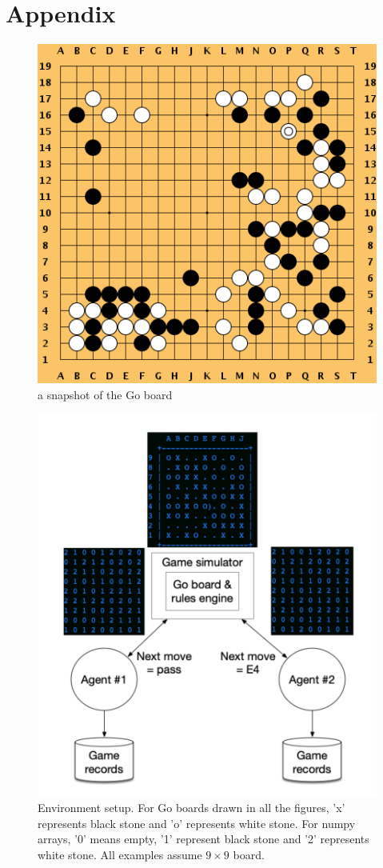 \documentclass{article}
\begin{document}
 

\section*{Appendix}
\begin{figure}[H]
\begin{center}
\includegraphics[width=0.25\linewidth]{goboard}
\end{center}
\caption{a snapshot of the Go board}
\label{fig:goboard}
\end{figure}

\begin{figure}[H]
\centering
\includegraphics[width=0.8\linewidth]{simulator}
\caption{Environment setup. For Go boards drawn in all the figures, 'x' represents black stone and 'o' represents white stone. For numpy arrays, '0' means empty, '1' represent black stone and '2' represents white stone. All examples assume $9 \times 9$ board.}
\label{fig:env}
\end{figure}
\end{document}

